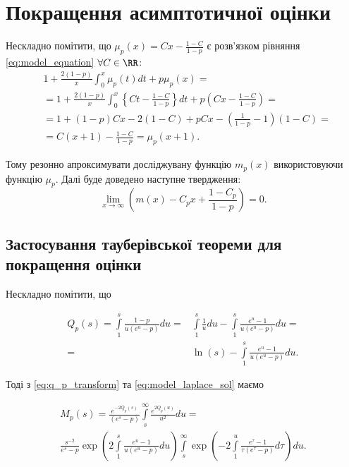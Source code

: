 \section{Покращення асимптотичної оцінки}

Нескладно помітити, що $\mu_{p}(x) = C x - \frac{1-C}{1 - p}$ є розв'язком рівняння \eqref{eq:model_equation} $\forall C \in \RR$:
\begin{align*}
&1 + \frac{2 (1-p)}{x} \int_{0}^{x} \mu_{p}(t) dt + p\mu_{p}(x) = \\
&=1 + \frac{2 (1-p)}{x} \int_{0}^{x} \left\{C t - \frac{1 - C}{1 - p} \right\} dt + p \left( C x - \frac{1 - C}{1 - p}\right) = \\
&=1 + (1 - p) C x - 2(1 - C) + p C x - (\frac{1}{1 - p} - 1)(1 - C) = \\
&= C(x + 1) - \frac{1 - C}{1 - p} = \mu_{p}(x+1).
\end{align*}

Тому резонно апроксимувати досліджувану функцію $m_{p}(x)$ використовуючи функцію $\mu_{p}$. Далі буде доведено наступне твердження:
\begin{equation}
\label{eq:fine_asymptotics_1}
\lim\limits_{x \rightarrow \infty} \left( m(x) - C_{p} x + \frac{1 - C_{p}}{1 - p} \right) = 0.
\end{equation}

\subsection{Застосування тауберівської теореми для покращення оцінки}

Нескладно помітити, що

\begin{equation}
\label{eq:q_p_transform}
\begin{split}
Q_{p}(s) = \int\limits_{1}^{s} \frac{1-p}{u(e^u - p)} du =& \int\limits_{1}^{s} \frac{1}{u} du - \int\limits_{1}^{s} \frac{e^u -1}{u(e^u - p)} du = \\
=& \ln(s) - \int\limits_{1}^{s} \frac{e^u -1}{u(e^u - p)} du.
\end{split}
\end{equation}

Тоді з \eqref{eq:q_p_transform} та \eqref{eq:model_laplace_sol} маємо

\begin{gather*}
M_{p}(s) =\frac{e^{-2Q_p(s)}}{(e^s - p)} \int\limits_s^\infty \frac{e^{2Q_p(u)}}{u^2} du = \\
\frac{s^{-2}}{e^s-p} \exp \left(2 \int\limits_{1}^{s} \frac{e^u -1}{u(e^u - p)} du\right) \int\limits_s^\infty \exp\left(-2 \int\limits_{1}^{u} \frac{e^\tau -1}{\tau(e^\tau - p)} d\tau\right) du.
\end{gather*}

